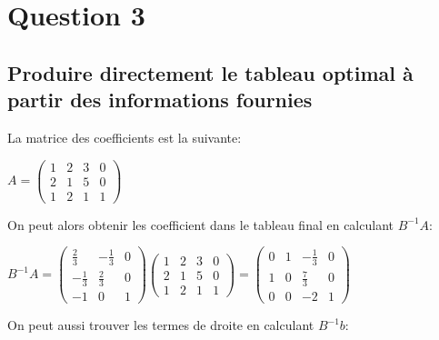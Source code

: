 \section*{Question 3}

\subsection{Produire directement le tableau optimal à partir des informations fournies}
	
La matrice des coefficients est la suivante:

\begin{center}
	\begin{math}
	A = 
	\begin{pmatrix}
		1 & 2 & 3 & 0 \\
		2 & 1 & 5 & 0 \\
		1 & 2 & 1 & 1
	\end{pmatrix}
	\end{math}
\end{center}

On peut alors obtenir les coefficient dans le tableau final en calculant $B^{-1}A$:
	
\begin{center}
	\begin{math}
	B^{-1}A =
	\begin{pmatrix}
		\frac{2}{3}  & -\frac{1}{3} & 0 \\[5pt]
		-\frac{1}{3} & \frac{2}{3}  & 0 \\[5pt]
		-1           & 0            & 1
	\end{pmatrix}
	\begin{pmatrix}
		1 & 2 & 3 & 0 \\[5pt]
		2 & 1 & 5 & 0 \\[5pt]
		1 & 2 & 1 & 1
	\end{pmatrix}
	=
	\begin{pmatrix}
		0 & 1 & -\frac{1}{3} & 0 \\[5pt]
		1 & 0 & \frac{7}{3}  & 0 \\[5pt]
		0 & 0 & -2           & 1
	\end{pmatrix}
	\end{math}
\end{center}

On peut aussi trouver les termes de droite en calculant $B^{-1}b$:


